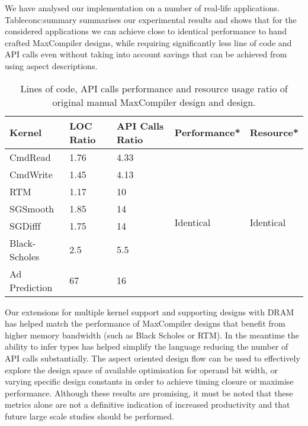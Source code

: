 We have analysed our implementation on a number of real-life
applications. Table{conc:summary} summarises our experimental results
and shows that for the considered applications we can achieve close to
identical performance to hand crafted MaxCompiler designs, while
requiring significantly less line of code and API calls even without
taking into account savings that can be achieved from using aspect
descriptions.

\begin{table}[ht!]
\begin{tabularx}{\textwidth}{X|X|X|X|X}
\textbf{Kernel} & \textbf{LOC Ratio} & \textbf{API Calls Ratio} & \textbf{Performance*}        & \textbf{Resource*}
          \\
\hline\hline
CmdRead         & 1.76                              & 4.33                                     & \multirow{7}{*}{Identical} & \multirow{7}{*}{Identical} \\
CmdWrite        & 1.45                              & 4.13                                     &                            &                            \\
RTM             & 1.17                              & 10                                       &                            &                            \\
SGSmooth        & 1.85                              & 14                                       &                            &                            \\
SGDifff         & 1.75                              & 14                                       &                            &                            \\
Black-Scholes   & 2.5                               & 5.5                                      &                            &                            \\
Ad Prediction  & 67                                & 16                                       &                            &                            \\
\end{tabularx}
\caption{Lines of code, API calls performance and resource usage ratio of original manual MaxCompiler design and \FAST{} design.}
\label{conc:summary}
\end{table}


Our extensions for multiple kernel support and supporting designs with
DRAM has helped match the performance of MaxCompiler designs that
benefit from higher memory bandwidth (such as Black Scholes or
RTM). In the meantime the ability to infer types has helped simplify
the language reducing the number of API calls substantially. The
aspect oriented design flow can be used to effectively explore the
design space of available optimisation for operand bit width, or
varying specific design constants in order to achieve timing closure
or maximise performance. Although these results are promising, it must
be noted that these metrics alone are not a definitive indication of
increased productivity and that future large scale studies should be
performed.


